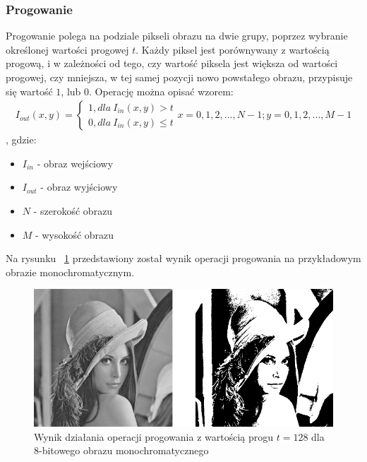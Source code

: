 \subsubsection{Progowanie} \label{sssec:threshold}
Progowanie polega na podziale pikseli obrazu na dwie grupy, poprzez wybranie określonej wartości progowej $t$. Każdy piksel jest porównywany z wartością progową, i w zależności od tego, czy wartość piksela jest większa od wartości progowej, czy mniejsza, w tej samej pozycji nowo powstałego obrazu, przypisuje się wartość $1$, lub $0$. Operację można opisać wzorem:
\begin{gather*}
  I_{out}(x, y) = \left\{\begin{matrix}
      1, dla \: I_{in}(x, y) > t\\
      0, dla \: I_{in}(x, y) \leq t
    \end{matrix}\right. x=0,1,2,...,N-1; y=0,1,2,...,M-1
\end{gather*},
gdzie:
\begin{itemize}
  \item $I_{in}$ - obraz wejściowy
  \item $I_{out}$ - obraz wyjściowy
  \item $N$ - szerokość obrazu
  \item $M$ - wysokość obrazu
\end{itemize}
Na rysunku ~\ref{fig:lena_threshold} przedstawiony został wynik operacji progowania na przykładowym obrazie monochromatycznym.
\begin{figure}
  \centering
  \includegraphics[width=15cm]{img/lena-threshold}
  \caption{Wynik działania operacji progowania z wartością progu $t=128$ dla 8-bitowego obrazu monochromatycznego}
  \label{fig:lena_threshold}
\end{figure}
